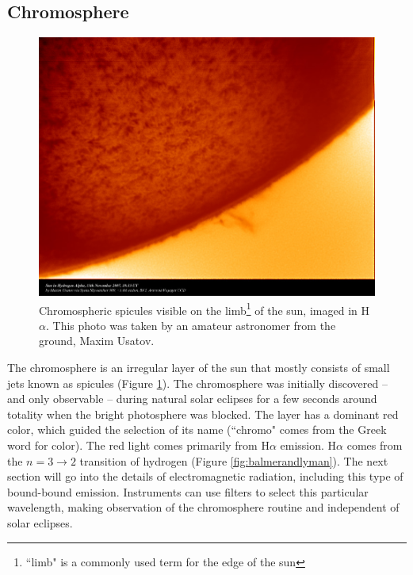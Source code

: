 \subsection{Chromosphere}

\begin{figure}[!h]
    \begin{center}
	    \includegraphics[width=120mm]{Images/Spicules.png}
    \end{center}
    \caption[Spicules of the Chromosphere]{
        Chromospheric spicules visible on the limb\footnote{``limb" is a commonly used term for the edge
        of the sun} of the sun, imaged in H$\alpha$. This photo was taken by an amateur astronomer from the ground, 
        Maxim Usatov. 
    }
    \label{fig:spicules}
\end{figure}

The chromosphere is an irregular layer of the sun that mostly consists of small jets known as spicules (Figure \ref{fig:spicules}). The chromosphere was initially discovered -- and only observable -- during natural solar eclipses for a few seconds around totality when the bright photosphere was blocked. The layer has a dominant red color, which guided the selection of its name (``chromo" comes from the Greek word for color). The red light comes primarily from H$\alpha$ emission. H$\alpha$ comes from the $n = 3\rightarrow 2$ transition of hydrogen (Figure \ref{fig:balmerandlyman}). The next section will go into the details of electromagnetic radiation, including this type of bound-bound emission. Instruments can use filters to select this particular wavelength, making observation of the chromosphere routine and independent of solar eclipses. 

